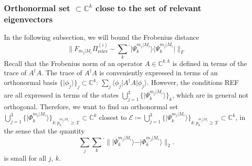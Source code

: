 \subsubsection{Orthonormal set $\subset \mathbb{C}^k$ close to the set of relevant eigenvectors}
In the following subsection, we will bound the Frobenius distance
\begin{equation}
\|F_{m_j\vert M_i}\Pi_{\text{relev}}^{(i)}-\sum_{k}{}^{'}\vert \Psi_k^{m_j\vert M_i}\rangle \langle \Psi_k^{m_j\vert M_i}\vert \|_F
\end{equation}
Recall that the Frobenius norm of an operator $A\in\mathbb{C}^{k,k}$ is defined in terms of the trace of $A^{\dag}A$. The trace of $A^{\dag}A$ is conveniently expressed in terms of an orthonormal basis $\{\vert \phi_j \rangle\}_j\subset \mathbb{C}^k$: $\sum_j \langle \phi_j \vert A^{\dag}A \vert \phi_j \rangle$. However, the conditions REF are all expressed in terms of the states $\bigcup\limits_{j=1}^3\{\vert \Psi_k^{m_j\vert M_i} \rangle\}_k$, which are in general not orthogonal. Therefore, we want to find an orthonormal set $\bigcup\limits_{j=1}^3\{\vert \Phi_k^{m_j\vert M_i}\rangle\}_{k:p_k^{m_j\vert M_i}\geq \mathcal{X}}\subset\mathbb{C}^k$ closest to $\mathcal{E}\coloneqq\bigcup\limits_{j=1}^3\{\vert \Psi_k^{m_j\vert M_i}\rangle\}_{k:p_k^{m_j\vert M_i}\geq \mathcal{X}}\subset\mathbb{C}^k$, in the sense that the quantity
\begin{equation}
\sum_{j}\sum_{k}{}^{'}\|\vert \Psi_k^{m_j\vert M_i} \rangle - \vert \Phi_k^{m_j\vert M_i} \rangle \|_2.
\end{equation}
is small for all $j$, $k$.

